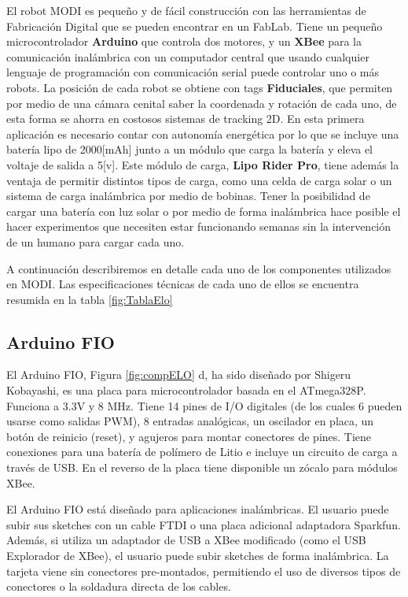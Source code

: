 El robot MODI es pequeño y de fácil construcción con las herramientas de Fabricación Digital que se pueden encontrar en un FabLab. Tiene un pequeño microcontrolador \textbf{Arduino} que controla dos motores, y un \textbf{XBee} para la comunicación inalámbrica con un computador central que usando cualquier lenguaje de programación con comunicación serial puede controlar uno o más robots. La posición de cada robot se obtiene con tags \textbf{Fiduciales}, que permiten por medio de una cámara cenital saber la coordenada y rotación de cada uno, de esta forma se ahorra en costosos sistemas de tracking 2D. En esta primera aplicación es necesario contar con autonomía energética por lo que se incluye una batería lipo de 2000[mAh] junto a un módulo que carga la batería y eleva el voltaje de salida a 5[v]. Este módulo de carga, \textbf{Lipo Rider Pro}, tiene además la ventaja de permitir distintos tipos de carga, como una celda de carga solar o un sistema de carga inalámbrica por medio de bobinas. Tener la posibilidad de cargar una batería con luz solar o por medio de forma inalámbrica hace posible el hacer experimentos que necesiten estar funcionando semanas sin la intervención de un humano para cargar cada uno.

A continuación describiremos en detalle cada uno de los componentes utilizados en MODI. Las especificaciones técnicas de cada uno de ellos se encuentra resumida en la tabla \ref{fig:TablaElo}

\subsection{Arduino FIO}
El Arduino FIO, Figura \ref{fig:compELO} d, ha sido diseñado por Shigeru Kobayashi, es una placa para microcontrolador basada en el ATmega328P. Funciona a 3.3V y 8 MHz. Tiene 14 pines de I/O digitales (de los cuales 6 pueden usarse como salidas PWM), 8 entradas analógicas, un oscilador en placa, un botón de reinicio (reset), y agujeros para montar conectores de pines. Tiene conexiones para una batería de polímero de Litio e incluye un circuito de carga a través de USB. En el reverso de la placa tiene disponible un zócalo para módulos XBee.

El Arduino FIO está diseñado para aplicaciones inalámbricas. El usuario puede subir sus sketches con un cable FTDI o una placa adicional adaptadora Sparkfun. Además, si utiliza un adaptador de USB a XBee modificado (como el USB Explorador de XBee), el usuario puede subir sketches de forma inalámbrica. La tarjeta viene sin conectores pre-montados, permitiendo el uso de diversos tipos de conectores o la soldadura directa de los cables. 

